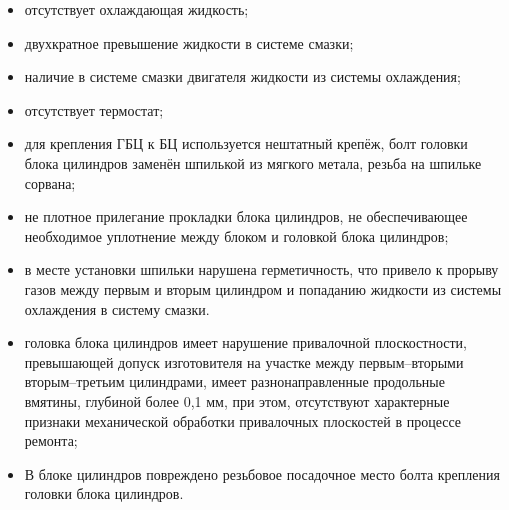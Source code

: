 \begin{itemize}
    \item 	отсутствует охлаждающая жидкость;
    \item   двухкратное превышение жидкости в системе смазки; 
    \item 	наличие в системе смазки двигателя жидкости из системы охлаждения;
    \item 	отсутствует термостат;
    \item 	для крепления ГБЦ к БЦ используется нештатный крепёж, болт головки блока цилиндров заменён шпилькой из мягкого метала, резьба 
    на шпильке сорвана;
    \item  не плотное прилегание прокладки блока цилиндров, не обеспечивающее необходимое уплотнение между блоком и головкой блока цилиндров;
    \item   в месте установки шпильки нарушена герметичность, что привело к  прорыву газов между первым и вторым цилиндром и попаданию жидкости из системы охлаждения в систему смазки. 
    \item 	головка блока цилиндров имеет нарушение привалочной плоскостности, превышающей допуск изготовителя  на участке между первым--вторыми вторым--третьим цилиндрами, имеет разнонаправленные продольные вмятины, глубиной более 0,1 мм, при этом, отсутствуют характерные признаки механической обработки привалочных плоскостей в процессе ремонта; 
    \item 	В блоке цилиндров повреждено резьбовое посадочное место болта крепления головки блока цилиндров. 
\end{itemize}



